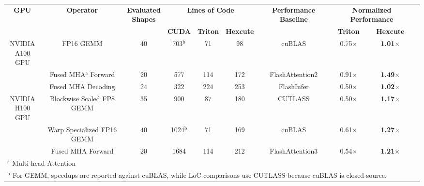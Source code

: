 \documentclass[10pt,a4paper]{article}
\begin{document}
\begin{table}[t!]
{\scriptsize
\begin{center}
\begin{tabular}{cccccccccc}
\hline
 \multirow{2}{*}{\textbf{GPU}} & \multirow{2}{*}{\textbf{Operator}} & \multirowcell{2}{\textbf{Evaluated}\\\textbf{Shapes}} & \multicolumn{3}{c}{\textbf{Lines of Code}}&\multirow{2}{*}{\textbf{Performance Baseline}}&\multicolumn{2}{c}{\textbf{Normalized Performance}} \\
 & & & \textbf{CUDA}& \textbf{Triton}& \textbf{Hexcute}& &\textbf{Triton}& \textbf{Hexcute}
\\
\hline
\multirowcell{4}{NVIDIA\\ A100 GPU} & FP16 GEMM&40& 703$^\mathrm{b}$ & 71 & 98 & cuBLAS & 0.75$\times$ & \textbf{1.01$\times$} &  \\
& Fused MHA$^\mathrm{a}$ Forward&20& 577 & 114 & 172 & FlashAttention2 & 0.91$\times$ & \textbf{1.49$\times$} \\
& Fused MHA Decoding&24& 322 & 224 & 253 & FlashInfer & 0.50$\times$ & \textbf{1.02$\times$} \\
\hline
\multirowcell{3}{NVIDIA \\ H100 GPU} & Blockwise Scaled FP8 GEMM & 35 & 900 & 87 & 180 & CUTLASS & 0.50$\times$ & \textbf{1.17$\times$} \\
& Warp Specialized FP16 GEMM & 40 & 1024$^\mathrm{b}$ & 71 & 169 & cuBLAS & 0.61$\times$ & \textbf{1.27$\times$} \\
& Fused MHA Forward & 20 & 1684 & 114 & 212 & FlashAttention3 & 0.54$\times$ & \textbf{1.21$\times$} \\
\hline
\multicolumn{10}{l}{$^{\mathrm{a}}$ Multi-head Attention}\\
\multicolumn{10}{l}{$^{\mathrm{b}}$ For GEMM, speedups are reported against cuBLAS, while LoC comparisons use CUTLASS because cuBLAS is closed‑source.}
\end{tabular}
\label{general-operators}
\end{center}
}
\end{table}
\end{document}
